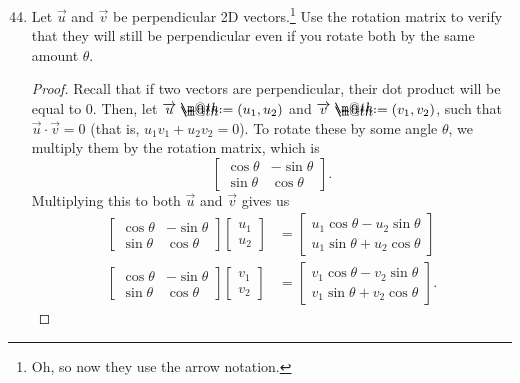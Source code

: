 \documentclass{article}
\makeatletter
\newcommand*{\defeq}{\mathrel{\rlap{%
                     \raisebox{0.3ex}{$\m@th\cdot$}}%
                     \raisebox{-0.3ex}{$\m@th\cdot$}}%
                     =}
\makeatother
\begin{document}
\begin{enumerate}
    \setcounter{enumi}{43}
    \item Let \(\overrightarrow{u}\) and \(\overrightarrow{v}\) be perpendicular 2D vectors.\footnote{Oh, so now they use the arrow notation.} Use the rotation matrix to verify that they will still be perpendicular even if you rotate both 
    by the same amount \(\theta\).\begin{proof}
        Recall that if two vectors are perpendicular, their dot product will be equal to 0. Then, let \(\overrightarrow{u} \defeq (u_1,u_2)\) and \(\overrightarrow{v} \defeq (v_1,v_2)\), such that \(\overrightarrow{u} \cdot \overrightarrow{v} = 0\) (that is, 
        \(u_1 v_1 + u_2 v_2 = 0\)). To rotate these by some angle \(\theta\), we multiply them by the rotation matrix, which is\[
            \begin{bmatrix}
                \cos\theta & -\sin\theta \\ \sin\theta & \cos\theta
            \end{bmatrix}.
        \] Multiplying this to both \(\overrightarrow{u}\) and \(\overrightarrow{v}\) gives us\begin{align}
            \begin{bmatrix}
                \cos\theta & -\sin\theta \\ \sin\theta & \cos\theta
            \end{bmatrix} \begin{bmatrix}
                u_1\\u_2
            \end{bmatrix} &= \begin{bmatrix}
                u_1 \cos\theta - u_2\sin\theta \\ u_1\sin\theta + u_2\cos\theta 
            \end{bmatrix} \label{u_rot} \\ 
            \begin{bmatrix}
                \cos\theta & -\sin\theta \\ \sin\theta & \cos\theta
            \end{bmatrix} \begin{bmatrix}
                v_1\\v_2
            \end{bmatrix} &= \begin{bmatrix}
                v_1 \cos\theta - v_2\sin\theta \\ v_1\sin\theta + v_2\cos\theta
            \end{bmatrix}. \label{v_rot}

\end{align}
\end{proof}
\end{enumerate}
\end{document}
